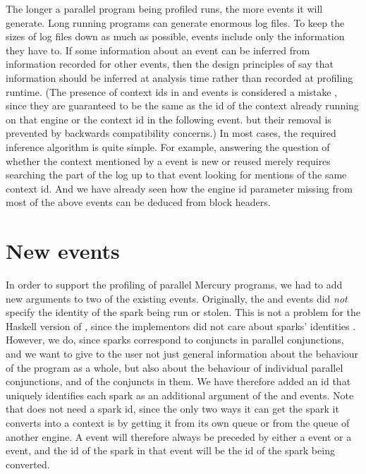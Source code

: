 The longer a parallel program being profiled runs,
the more events it will generate.
Long running programs can generate enormous log files.
To keep the sizes of log files down as much as possible,
events include only the information they have to.
If some information about an event
can be inferred from information recorded for other events,
then the design principles of \tscope say
that information should be inferred at analysis time
rather than recorded at profiling runtime.
(The presence of context ids in  and 
events is considered a mistake \citep{threadscope-summit},
since they are guaranteed to be the same as the id of the context already
running on that engine or
the context id in the following  event.
but their removal is prevented by backwards compatibility concerns.)
In most cases, the required inference algorithm is quite simple.
For example, answering the question of whether the context
mentioned by a  event is new or reused
merely requires searching the part of the log up to that event
looking for mentions of the same context id.
And we have already seen how the engine id parameter
missing from most of the above events
can be deduced from block headers.

\section{New events}
\label{sec:tscope_newevents}

In order to support the profiling of parallel Mercury programs,
we had to add new arguments to two of the existing \tscope events.
Originally, the  and  events
did \emph{not} specify the identity of the spark being run or stolen.
This is not a problem for the Haskell version of \tscope,
since the implementors did not care about sparks' identities
\citep{threadscope-summit}.
However, we do, since sparks correspond to conjuncts in parallel conjunctions,
and we want to give to the user not just general information
about the behaviour of the program as a whole,
but also about the behaviour of individual parallel conjunctions,
and of the conjuncts in them.
We have therefore added an id that uniquely identifies each spark
as an additional argument of the  and 
events.
Note that  does not need a spark id,
since the only two ways it can get the spark it converts into a context
is by getting it from its own queue or from the queue of another engine.
A  event will therefore always be preceded
by either a  event or a  event,
and the id of the spark in that event
will be the id of the spark being converted.

